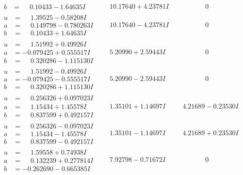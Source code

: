 \documentclass[1p]{elsarticle_modified}
\theoremstyle{definition}
\begin{document}
$$\begin{array}{c|c|c}
\begin{aligned}
b &= \phantom{-}0.10433 - 1.64635 I\end{aligned}
 & \phantom{-}10.17640 + 4.23781 I & \phantom{-0.000000 } 0 \\ \hline\begin{aligned}
u &= \phantom{-}1.39525 - 0.58208 I \\
a &= \phantom{-}0.149798 - 0.780263 I \\
b &= \phantom{-}0.10433 + 1.64635 I\end{aligned}
 & \phantom{-}10.17640 - 4.23781 I & \phantom{-0.000000 } 0 \\ \hline\begin{aligned}
u &= \phantom{-}1.51992 + 0.49926 I \\
a &= -0.079425 + 0.555517 I \\
b &= \phantom{-}0.320286 - 1.115130 I\end{aligned}
 & \phantom{-}5.20990 + 2.59443 I & \phantom{-0.000000 } 0 \\ \hline\begin{aligned}
u &= \phantom{-}1.51992 - 0.49926 I \\
a &= -0.079425 - 0.555517 I \\
b &= \phantom{-}0.320286 + 1.115130 I\end{aligned}
 & \phantom{-}5.20990 - 2.59443 I & \phantom{-0.000000 } 0 \\ \hline\begin{aligned}
u &= \phantom{-}0.256326 + 0.097023 I \\
a &= \phantom{-}1.15434 + 1.45578 I \\
b &= \phantom{-}0.837599 + 0.492157 I\end{aligned}
 & \phantom{-}1.35101 + 1.14697 I & \phantom{-}4.21689 - 0.23530 I \\ \hline\begin{aligned}
u &= \phantom{-}0.256326 - 0.097023 I \\
a &= \phantom{-}1.15434 - 1.45578 I \\
b &= \phantom{-}0.837599 - 0.492157 I\end{aligned}
 & \phantom{-}1.35101 - 1.14697 I & \phantom{-}4.21689 + 0.23530 I \\ \hline\begin{aligned}
u &= \phantom{-}1.59558 + 0.74938 I \\
a &= \phantom{-}0.132239 + 0.277814 I \\
b &= -0.262690 - 0.665385 I\end{aligned}
 & \phantom{-}7.92798 - 0.71672 I & \phantom{-0.000000 } 0 \\ \hline\begin{aligned}

\end{aligned}
\end{array}$$
\end{document}
